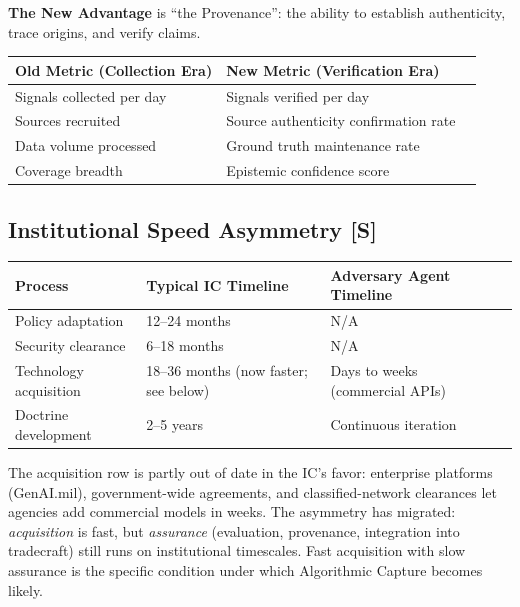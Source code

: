 \documentclass[11pt,letterpaper]{article}
\begin{document}
\textbf{The New Advantage} is ``the Provenance'': the ability to establish authenticity, trace origins, and verify claims.

\begin{keybox}
\begin{center}
\small
\begin{tabularx}{\linewidth}{ZY{0.96}Y{1.04}}
\textbf{Old Metric (Collection Era)} & \textbf{New Metric (Verification Era)} \\
\midrule
Signals collected per day & Signals verified per day \\
Sources recruited & Source authenticity confirmation rate \\
Data volume processed & Ground truth maintenance rate \\
Coverage breadth & Epistemic confidence score \\
\end{tabularx}
\end{center}
\end{keybox}

\subsection{Institutional Speed Asymmetry [S]}

\begin{center}
\small
\begin{tabularx}{\linewidth}{ZY{0.96}Y{0.96}Y{1.08}}
\toprule
\textbf{Process} & \textbf{Typical IC Timeline} & \textbf{Adversary Agent Timeline} \\
\midrule
Policy adaptation & 12--24 months & N/A \\
Security clearance & 6--18 months & N/A \\
Technology acquisition & 18--36 months (now faster; see below) & Days to weeks (commercial APIs) \\
Doctrine development & 2--5 years & Continuous iteration \\
\bottomrule
\end{tabularx}
\end{center}

\begin{keybox}[A 2026 Correction {[O/E]}]
The acquisition row is partly out of date in the IC's favor: enterprise platforms (GenAI.mil), government-wide agreements, and classified-network clearances let agencies add commercial models in weeks. The asymmetry has migrated: \textit{acquisition} is fast, but \textit{assurance} (evaluation, provenance, integration into tradecraft) still runs on institutional timescales. Fast acquisition with slow assurance is the specific condition under which Algorithmic Capture becomes likely.
\end{keybox}
\end{document}
